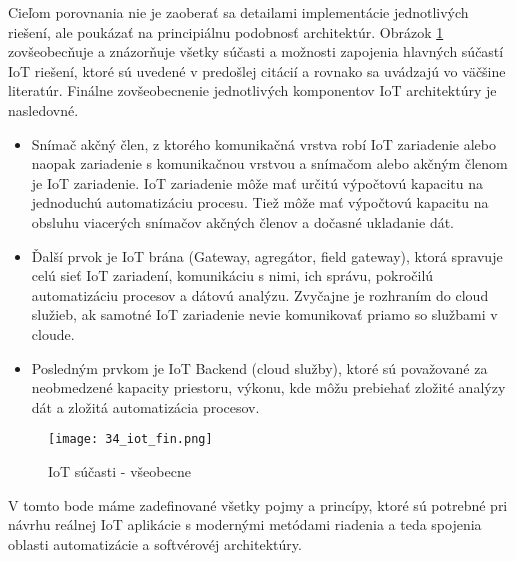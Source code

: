 Cieľom porovnania nie je zaoberať sa detailami implementácie jednotlivých riešení, ale poukázať na principiálnu podobnosť architektúr. Obrázok \ref{34_iot_fin} zovšeobecňuje a znázorňuje všetky súčasti a možnosti zapojenia hlavných súčastí IoT riešení, ktoré sú uvedené v predošlej citácií a rovnako sa uvádzajú vo väčšine literatúr. Finálne zovšeobecnenie jednotlivých komponentov IoT architektúry je nasledovné. 
\begin{itemize}
\item Snímač akčný člen, z ktorého komunikačná vrstva robí IoT zariadenie alebo naopak zariadenie s komunikačnou vrstvou a snímačom alebo akčným členom je IoT zariadenie. IoT zariadenie môže mať určitú výpočtovú kapacitu na jednoduchú automatizáciu procesu. Tiež môže mať výpočtovú kapacitu na obsluhu viacerých snímačov akčných členov a dočasné ukladanie dát. 
\item Ďalší prvok je IoT brána (Gateway, agregátor, field gateway), ktorá spravuje celú sieť IoT zariadení, komunikáciu s nimi, ich správu, pokročilú automatizáciu procesov a dátovú analýzu. Zvyčajne je rozhraním do cloud služieb, ak samotné IoT zariadenie nevie komunikovať priamo so službami v cloude. 
\item Posledným prvkom je IoT Backend (cloud služby), ktoré sú považované za neobmedzené kapacity priestoru, výkonu, kde môžu prebiehať zložité analýzy dát a zložitá automatizácia procesov.
\end{itemize}
\begin{figure}[!htbp]
\centering
\texttt{[image: 34\_iot\_fin.png]}
\caption{IoT súčasti - všeobecne\cite{IOT23}}
\label{34_iot_fin}
\end{figure} 

V tomto bode máme zadefinované všetky pojmy a princípy, ktoré sú potrebné pri návrhu reálnej IoT aplikácie s modernými metódami riadenia a teda spojenia oblasti automatizácie a softvérovéj architektúry. 


